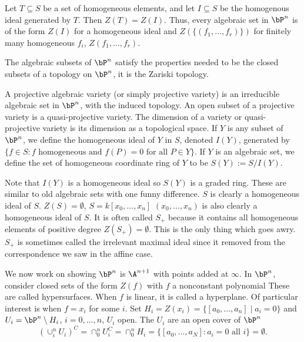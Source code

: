 \begin{prop}
Let $T \subseteq S$ be a set of homogeneous elements, and let $I \subseteq S$ be the homogenous ideal generated by $T$. Then $Z(T)= Z(I)$. Thus, every algebraic set in $\bP^n$ is of the form $Z(I)$ for a homogeneous ideal and $Z(\{(f_1,\ldots,f_r)\})$ for finitely many homogeneous $f_i$, $Z(f_1,\ldots,f_r)$. 
\end{prop}


The algebraic subsets of $\bP^n$ satisfy the properties needed to be the closed subsets of a topology on $\bP^n$, it is the Zariski topology. 


\begin{dfn}
A projective algebraic variety (or simply projective variety) is an irreducible algebraic set in $\bP^n$, with the induced topology. An open subset of a projective variety is a quasi-projective variety. The dimension of a variety or quasi-projective variety is its dimension as a topological space. If $Y$ is any subset of $\bP^n$, we define the homogeneous ideal of $Y$ in $S$, denoted $I(Y)$, generated by $\{ f \in S \colon f \text{ homogeneous and } f(P)=0 \text{ for all }P \in Y\}$. If $Y$ is an algebraic set, we define the set of homogeneous coordinate ring of $Y$ to be $S(Y):= S/I(Y)$.
\end{dfn}


Note that $I(Y)$ is a homogeneous ideal so $S(Y)$ is a graded ring. These are similar to old algebraic sets with one funny difference. $S$ is clearly a homogeneous ideal of $S$. $Z(S)= \emptyset$, $S= k[x_0,\ldots,x_n]$ $(x_0,\ldots,x_n)$ is also clearly a homogeneous ideal of $S$. It is often called $S_+$ because it contains all homogeneous elements of positive degree $Z(S_+)= \emptyset$. This is the only thing which goes awry. $S_+$ is sometimes called the irrelevant maximal ideal since it removed from the correspondence we saw in the affine case. 


We now work on showing $\bP^n$ is $\A^{n+1}$ with points added at $\infty$. In $\bP^n$, consider closed sets of the form $Z(f)$ with $f$ a nonconstant polynomial These are called hypersurfaces. When $f$ is linear, it is called a hyperplane. Of particular interest is when $f= x_i$ for some $i$. Set $H_i= Z(x_i)= \{[a_0,\ldots,a_n] \;|\; a_i=0 \}$ and $U_i= \bP^n \setminus H_i$, $i=0,\ldots,n$, $U_i$ open. The $U_i$ are an open cover of $\bP^n$
	\[
	(\cup_i^n U_i)^C= \cap_0^n U_i^C= \cap_0^n H_i= \{[a_0,\ldots,a_N] \colon a_i= 0 \text{ all }i\}= \emptyset. 
	\]




























